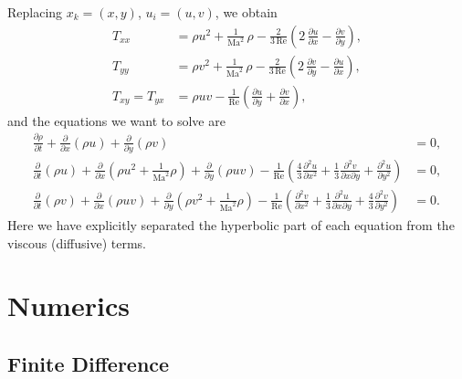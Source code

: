 \documentclass[11pt]{article}
\newcommand{\Ma}{\text{Ma}}
\newcommand{\Rey}{\text{Re}}
\begin{document}
Replacing $x_k = (x,y)$, $u_i = (u, v)$, we obtain
\begin{align}
T_{xx} &= \rho u^2 + \frac{1}{\Ma^2}\,\rho - \frac{2}{3\,\Rey}\left( 2\,\frac{\partial u}{\partial x} - \frac{\partial v}{\partial y} \right),\\
T_{yy} &= \rho v^2 + \frac{1}{\Ma^2}\,\rho - \frac{2}{3\,\Rey}\left( 2\,\frac{\partial v}{\partial y} - \frac{\partial u}{\partial x} \right),\\
T_{xy} = T_{yx} &= \rho u v - \frac{1}{\Rey}\left( \frac{\partial u}{\partial y} + \frac{\partial v}{\partial x} \right),
\end{align}
and the equations we want to solve are
\begin{align}
\frac{\partial\rho}{\partial t} + \frac{\partial}{\partial x}\left(\rho u\right) + \frac{\partial}{\partial y}\left(\rho v\right) &= 0,\\
\frac{\partial}{\partial t}\left(\rho u\right) + \frac{\partial}{\partial x}\left( \rho u^2 + \frac{1}{\Ma^2}\rho \right) + \frac{\partial}{\partial y}\left( \rho u v \right) - \frac{1}{\Rey}\left(\frac{4}{3}\frac{\partial^2u}{\partial x^2} + \frac{1}{3}\frac{\partial^2 v}{\partial x \partial y} + \frac{\partial^2u}{\partial y^2}\right) &= 0,\\
\frac{\partial}{\partial t}\left( \rho v\right) + \frac{\partial}{\partial x}\left( \rho uv \right) + \frac{\partial}{\partial y}\left( \rho v^2 + \frac{1}{\Ma^2}\rho\right) - \frac{1}{\Rey}\left( \frac{\partial^2 v}{\partial x^2} + \frac{1}{3}\frac{\partial^2u}{\partial x \partial y} +  \frac{4}{3}\frac{\partial^2 v}{\partial y^2} \right) &= 0.
\end{align}
Here we have explicitly separated the hyperbolic part of each equation from the viscous (diffusive) terms. 

\section{Numerics}

\subsection{Finite Difference}
\end{document}
